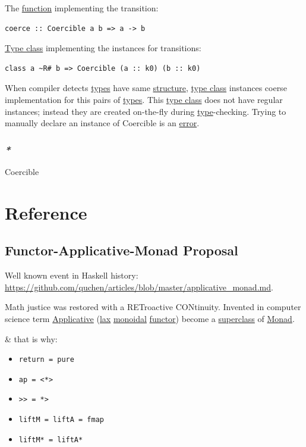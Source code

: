 \documentclass[a4paper,14pt,oneside]{book}
\begin{document}
The \hyperref[org6aff545]{function} implementing the transition:
\begin{verbatim}
coerce :: Coercible a b => a -> b
\end{verbatim}

\hyperref[org569b5ac]{Type class} implementing the instances for transitions:
\begin{verbatim}
class a ~R# b => Coercible (a :: k0) (b :: k0)
\end{verbatim}
When compiler detects \hyperref[org27ebdf4]{types} have same \hyperref[orgc93c793]{structure}, \hyperref[org569b5ac]{type class} instances coerse implementation for this pairs of \hyperref[org27ebdf4]{types}. This \hyperref[org569b5ac]{type class} does not have regular instances; instead they are created on-the-fly during \hyperref[org5b55790]{type}-checking. Trying to manually declare an instance of Coercible is an \hyperref[orgcc71459]{error}.

\section{\emph{*}}
\label{sec:org21a1f22}

Coercible

\part{Reference}
\label{sec:orgbfd9cab}

\chapter{\label{orgf9e9c9f}Functor-Applicative-Monad Proposal}
\label{sec:orgf53f30a}
Well known event in Haskell history: \url{https://github.com/quchen/articles/blob/master/applicative\_monad.md}.

Math justice was restored with a RETroactive CONtinuity. Invented in computer science term \hyperref[org5b376b7]{Applicative} (\hyperref[org2e4570d]{lax} \hyperref[orgf8b4a56]{monoidal} \hyperref[org757e79a]{functor}) become a \hyperref[org4f60466]{superclass} of \hyperref[orga53ba90]{Monad}.

\& that is why:
\begin{itemize}
\item \texttt{return = pure}
\item \texttt{ap = <*>}
\item \texttt{>> = *>}
\item \texttt{liftM = liftA = fmap}
\item \texttt{liftM* = liftA*}
\end{itemize}
\end{document}
